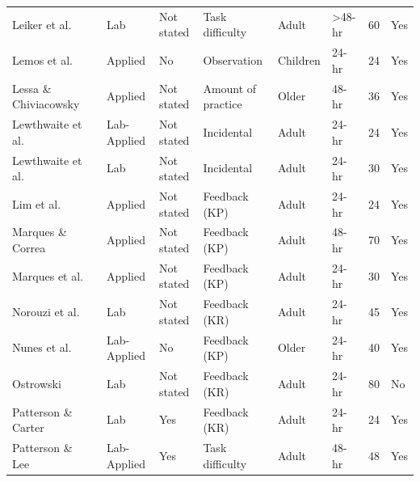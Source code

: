 \documentclass[man,floatsintext,hidelinks]{apa7}
\begin{document}
\begin{landscape}
\begin{longtable}[l]{lllllllll}
Leiker et al.         & \citeyear{Leiker2019-fz}          & Lab         & Not stated   & Task difficulty       & Adult        & \textgreater 48-hr & 60  & Yes       \\
Lemos et al.          & \citeyear{Lemos2017-qx}           & Applied     & No           & Observation           & Children     & 24-hr              & 24  & Yes       \\
Lessa \& Chiviacowsky & \citeyear{Lessa2015-eq}           & Applied     & Not stated   & Amount of practice    & Older        & 48-hr              & 36  & Yes       \\
Lewthwaite et al.     & \citeyear[Exp 1]{Lewthwaite2015-bd}    & Lab-Applied & Not stated   & Incidental            & Adult        & 24-hr              & 24  & Yes       \\
Lewthwaite et al.     & \citeyear[Exp 2]{Lewthwaite2015-bd}    & Lab         & Not stated   & Incidental            & Adult        & 24-hr              & 30  & Yes       \\
Lim et al.            & \citeyear{Lim2015-qs}          & Applied     & Not stated   & Feedback (KP)         & Adult        & 24-hr              & 24  & Yes       \\
Marques \& Correa     & \citeyear{Marques2016-aw}           & Applied     & Not stated   & Feedback (KP)         & Adult        & 48-hr              & 70  & Yes       \\
Marques et al.        & \citeyear{Marques2017-ue}           & Applied     & Not stated   & Feedback (KP)         & Adult        & 24-hr              & 30  & Yes       \\
Norouzi et al.        & \citeyear{Norouzi2016-cx}           & Lab         & Not stated   & Feedback (KR)         & Adult        & 24-hr              & 45  & Yes       \\
Nunes et al.         & \citeyear{Nunes2019-nr}           & Lab-Applied & No           & Feedback (KP)         & Older        & 24-hr              & 40  & Yes       \\
Ostrowski			      & \citeyear{Ostrowski2015-nb}           & Lab         & Not stated   & Feedback (KR)         & Adult        & 24-hr              & 80  & No        \\
Patterson \& Carter   & \citeyear{Patterson2010-tk}           & Lab         & Yes          & Feedback (KR)         & Adult        & 24-hr              & 24  & Yes       \\
Patterson \& Lee      & \citeyear{Patterson2010-uu}           & Lab-Applied & Yes          & Task difficulty       & Adult        & 48-hr              & 48  & Yes       \\

\end{longtable}
\end{landscape}
\end{document}
